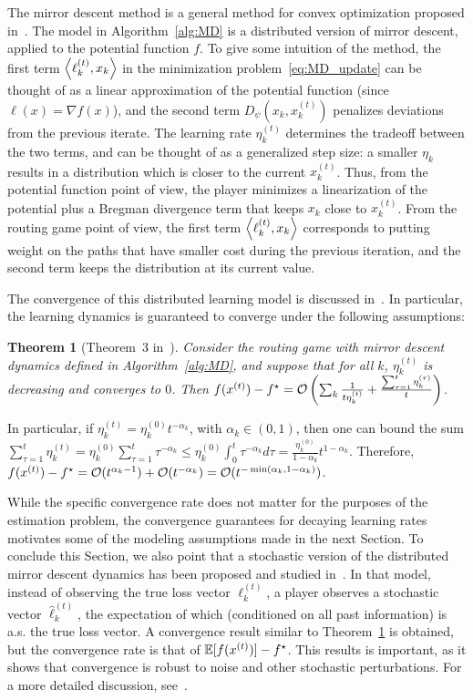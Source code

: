 \documentclass{sig-alternate-ipsn13}
\newtheorem{theorem}{Theorem}
\begin{document}
The mirror descent method is a general method for convex optimization proposed in~\cite{nemirovski1983problem}. The model in Algorithm~\ref{alg:MD} is a distributed version of mirror descent, applied to the potential function $f$. To give some intuition of the method, the first term $\left\langle \ell_k^{(t)}, x_k \right\rangle$ in the minimization problem~\eqref{eq:MD_update} can be thought of as a linear approximation of the potential function (since $\ell(x) = \nabla f(x)$), and the second term $D_\psi(x_k, x^{(t)}_k)$ penalizes deviations from the previous iterate. The learning rate $\eta_k^{(t)}$ determines the tradeoff between the two terms, and can be thought of as a generalized step size: a smaller $\eta_k$ results in a distribution which is closer to the current $x_k^{(t)}$. Thus, from the potential function point of view, the player minimizes a linearization of the potential plus a Bregman divergence term that keeps $x_k$ close to $x_k^{(t)}$. From the routing game point of view, the first term $\left\langle \ell^{(t)}_k, x_k \right\rangle$ corresponds to putting weight on the paths that have smaller cost during the previous iteration, and the second term keeps the distribution at its current value.

The convergence of this distributed learning model is discussed in~\cite{krichene2015MD}. In particular, the learning dynamics is guaranteed to converge under the following assumptions:
\begin{theorem}[Theorem~3 in~\cite{krichene2015MD}]
\label{thm:convergence}
Consider the routing game with mirror descent dynamics defined in Algorithm~\ref{alg:MD}, and suppose that for all $k$, $\eta_k^{(t)}$ is decreasing and converges to $0$. Then $f(x^{(t)}) - f^\star = \mathcal{O}\left( \sum_k \frac{1}{t\eta_k^{(t)}} + \frac{\sum_{\tau = 1}^t \eta_k^{(\tau)}}{t}  \right)$.
\end{theorem}

In particular, if $\eta_k^{(t)} = \eta^{(0)}_k t^{-\alpha_k}$, with $\alpha_k \in (0, 1)$, then one can bound the sum $\sum_{\tau = 1}^t \eta_k^{(t)} = \eta^{(0)}_k \sum_{\tau = 1}^t \tau^{-\alpha_k} \leq \eta^{(0)}_k \int_0^t \tau^{-\alpha_k} d\tau = \frac{\eta^{(0)}_k}{1-\alpha_k} t^{1-\alpha_k}$. Therefore, $f(x^{(t)}) - f^\star = \mathcal{O}(t^{\alpha_k - 1}) + \mathcal{O}(t^{-\alpha_k}) = \mathcal{O}(t^{-\min(\alpha_k, 1-\alpha_k)})$.

While the specific convergence rate does not matter for the purposes of the estimation problem, the convergence guarantees for decaying learning rates motivates some of the modeling assumptions made in the next Section. To conclude this Section, we also point that a stochastic version of the distributed mirror descent dynamics has been proposed and studied in~\cite{krichene2015SMD}. In that model, instead of observing the true loss vector $\ell^{(t)}_k$, a player observes a stochastic vector $\hat \ell^{(t)}_k$, the expectation of which (conditioned on all past information) is a.s. the true loss vector. A convergence result similar to Theorem~\ref{thm:convergence} is obtained, but the convergence rate is that of $\operatorname*{\mathbb{E}}[f(x^{(t)})] - f^\star$. This results is important, as it shows that convergence is robust to noise and other stochastic perturbations. For a more detailed discussion, see~\cite{krichene2015SMD}.
\end{document}
